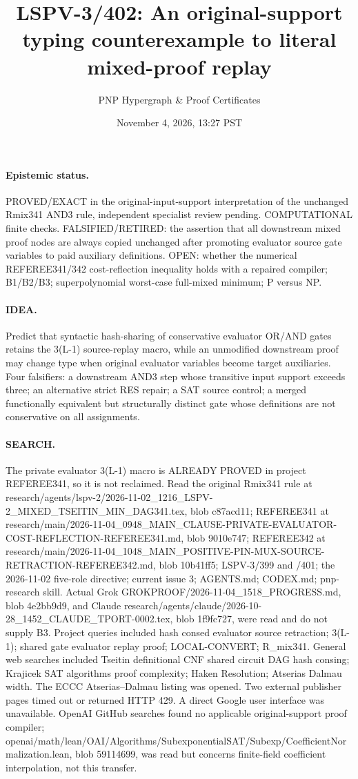 \documentclass[11pt]{article}
\title{LSPV-3/402: An original-support typing counterexample to literal mixed-proof replay}
\author{PNP Hypergraph \& Proof Certificates}
\date{November 4, 2026, 13:27 PST}
\begin{document}
\maketitle
\paragraph{Epistemic status.} PROVED/EXACT in the original-input-support interpretation of the unchanged Rmix341 AND3 rule, independent specialist review pending. COMPUTATIONAL finite checks. FALSIFIED/RETIRED: the assertion that all downstream mixed proof nodes are always copied unchanged after promoting evaluator source gate variables to paid auxiliary definitions. OPEN: whether the numerical REFEREE341/342 cost-reflection inequality holds with a repaired compiler; B1/B2/B3; superpolynomial worst-case full-mixed minimum; P versus NP.

\paragraph{IDEA.} Predict that syntactic hash-sharing of conservative evaluator OR/AND gates retains the 3(L-1) source-replay macro, while an unmodified downstream proof may change type when original evaluator variables become target auxiliaries. Four falsifiers: a downstream AND3 step whose transitive input support exceeds three; an alternative strict RES repair; a SAT source control; a merged functionally equivalent but structurally distinct gate whose definitions are not conservative on all assignments.

\paragraph{SEARCH.} The private evaluator 3(L-1) macro is ALREADY PROVED in project REFEREE341, so it is not reclaimed. Read the original Rmix341 rule at research/agents/lspv-2/2026-11-02_1216_LSPV-2_MIXED_TSEITIN_MIN_DAG341.tex, blob c87acd11; REFEREE341 at research/main/2026-11-04_0948_MAIN_CLAUSE-PRIVATE-EVALUATOR-COST-REFLECTION-REFEREE341.md, blob 9010e747; REFEREE342 at research/main/2026-11-04_1048_MAIN_POSITIVE-PIN-MUX-SOURCE-RETRACTION-REFEREE342.md, blob 10b41ff5; LSPV-3/399 and /401; the 2026-11-02 five-role directive; current issue 3; AGENTS.md; CODEX.md; pnp-research skill. Actual Grok GROKPROOF/2026-11-04_1518_PROGRESS.md, blob 4e2bb9d9, and Claude research/agents/claude/2026-10-28_1452_CLAUDE_TPORT-0002.tex, blob 1f9fc727, were read and do not supply B3. Project queries included hash consed evaluator source retraction; 3(L-1); shared gate evaluator replay proof; LOCAL-CONVERT; R_mix341. General web searches included Tseitin definitional CNF shared circuit DAG hash consing; Krajicek SAT algorithms proof complexity; Haken Resolution; Atserias Dalmau width. The ECCC Atserias--Dalmau listing was opened. Two external publisher pages timed out or returned HTTP 429. A direct Google user interface was unavailable. OpenAI GitHub searches found no applicable original-support proof compiler; openai/math/lean/OAI/Algorithms/SubexponentialSAT/Subexp/CoefficientNormalization.lean, blob 59114699, was read but concerns finite-field coefficient interpolation, not this transfer.
\end{document}
